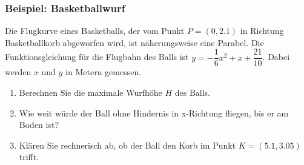 \subsubsection{Beispiel: Basketballwurf}
Die Flugkurve eines Basketballs, der vom Punkt $P=(0, 2.1)$ in Richtung Basketballkorb abgeworfen wird, ist näherungsweise eine Parabel. Die Funktionsgleichung für die Flugbahn des Balls ist $y=-\dfrac{1}{6}x^2 + x+ \dfrac{21}{10}$. Dabei werden $x$ und $y$ in Metern gemessen.
\begin{enumerate}[label=\alph*)]
    \item Berechnen Sie die maximale Wurfhöhe $H$ des Balls.
    \item Wie weit würde der Ball ohne Hindernis in x-Richtung fliegen, bis er am Boden ist?
    \item Klären Sie rechnerisch ab, ob der Ball den Korb im Punkt $K=(5.1, 3.05)$ trifft.
\end{enumerate}


